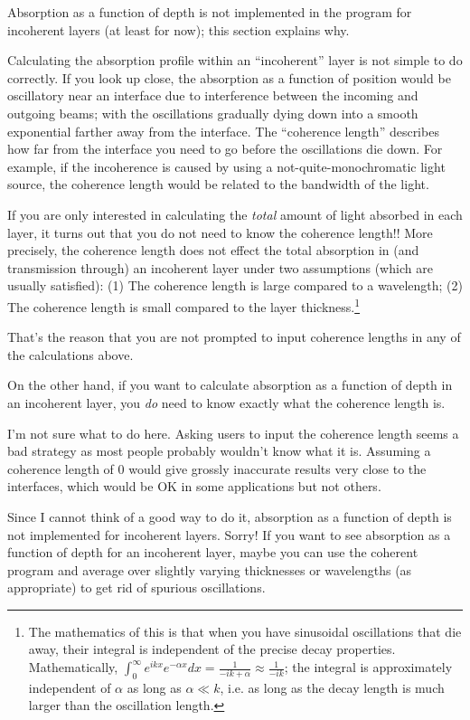 \documentclass[12pt]{article}
\renewcommand{\(}{\left(}
\renewcommand{\)}{\right)}
\begin{document}
Absorption as a function of depth is not implemented in the program for incoherent layers (at least for now); this section explains why.

Calculating the absorption profile within an ``incoherent'' layer is not simple to do correctly. If you look up close, the absorption as a function of position would be oscillatory near an interface due to interference between the incoming and outgoing beams; with the oscillations gradually dying down into a smooth exponential farther away from the interface. The ``coherence length'' describes how far from the interface you need to go before the oscillations die down. For example, if the incoherence is caused by using a not-quite-monochromatic light source, the coherence length would be related to the bandwidth of the light.

If you are only interested in calculating the \emph{total} amount of light absorbed in each layer, it turns out that you do not need to know the coherence length!! More precisely, the coherence length does not effect the total absorption in (and transmission through) an incoherent layer under two assumptions (which are usually satisfied): (1) The coherence length is large compared to a wavelength; (2) The coherence length is small compared to the layer thickness.\footnote{The mathematics of this is that when you have sinusoidal oscillations that die away, their integral is independent of the precise decay properties. Mathematically, $\int_0^\infty e^{ikx} e^{-\alpha x} dx = \frac{1}{-ik+\alpha} \approx \frac{1}{-ik}$; the integral is approximately independent of $\alpha$ as long as $\alpha \ll k$, i.e. as long as the decay length is much larger than the oscillation length.}

That's the reason that you are not prompted to input coherence lengths in any of the calculations above.

On the other hand, if you want to calculate absorption as a function of depth in an incoherent layer, you \emph{do} need to know exactly what the coherence length is.

I'm not sure what to do here. Asking users to input the coherence length seems a bad strategy as most people probably wouldn't know what it is. Assuming a coherence length of 0 would give grossly inaccurate results very close to the interfaces, which would be OK in some applications but not others.

Since I cannot think of a good way to do it, absorption as a function of depth is not implemented for incoherent layers. Sorry! If you want to see absorption as a function of depth for an incoherent layer, maybe you can use the coherent program and average over slightly varying thicknesses or wavelengths (as appropriate) to get rid of spurious oscillations.
\end{document}
